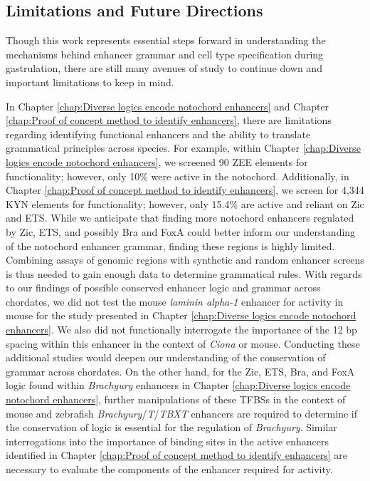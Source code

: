\begin{dissertationepilogue}
    \section{Limitations and Future Directions}
    Though this work represents essential steps forward in understanding the mechanisms behind enhancer grammar and cell type specification during gastrulation, there are still many avenues of study to continue down and important limitations to keep in mind.

    In Chapter \ref{chap:Diverse logics encode notochord enhancers} and Chapter \ref{chap:Proof of concept method to identify enhancers}, there are limitations regarding identifying functional enhancers and the ability to translate grammatical principles across species. For example, within Chapter \ref{chap:Diverse logics encode notochord enhancers}, we screened 90 ZEE elements for functionality; however, only 10\% were active in the notochord. Additionally, in Chapter \ref{chap:Proof of concept method to identify enhancers}, we screen for 4,344 KYN elements for functionality; however, only 15.4\% are active and reliant on Zic and ETS. While we anticipate that finding more notochord enhancers regulated by Zic, ETS, and possibly Bra and FoxA could better inform our understanding of the notochord enhancer grammar, finding these regions is highly limited. Combining assays of genomic regions with synthetic and random enhancer screens is thus needed to gain enough data to determine grammatical rules. With regards to our findings of possible conserved enhancer logic and grammar across chordates, we did not test the mouse \textit{laminin alpha-1} enhancer for activity in mouse for the study presented in Chapter \ref{chap:Diverse logics encode notochord enhancers}. We also did not functionally interrogate the importance of the 12 bp spacing within this enhancer in the context of \textit{Ciona} or mouse. Conducting these additional studies would deepen our understanding of the conservation of grammar across chordates. On the other hand, for the Zic, ETS, Bra, and FoxA logic found within \textit{Brachyury} enhancers in Chapter \ref{chap:Diverse logics encode notochord enhancers}, further manipulations of these TFBSs in the context of mouse and zebrafish \textit{Brachyury}/\textit{T}/\textit{TBXT} enhancers are required to determine if the conservation of logic is essential for the regulation of \textit{Brachyury}. Similar interrogations into the importance of binding sites in the active enhancers identified in Chapter \ref{chap:Proof of concept method to identify enhancers} are necessary to evaluate the components of the enhancer required for activity. 


\end{dissertationepilogue}
